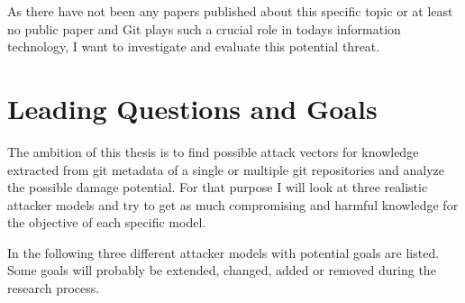 As there have not been any papers published about this specific topic or at least no public paper and Git plays such a crucial role in todays information technology, I want to investigate and evaluate this potential threat.


\section{Leading Questions and Goals}

The ambition of this thesis is to find possible attack vectors for knowledge extracted from git metadata of a single or multiple git repositories and analyze the possible damage potential.
For that purpose I will look at three realistic attacker models and try to get as much compromising and harmful knowledge for the objective of each specific model.

In the following three different attacker models with potential goals are listed.
Some goals will probably be extended, changed, added or removed during the research process.

